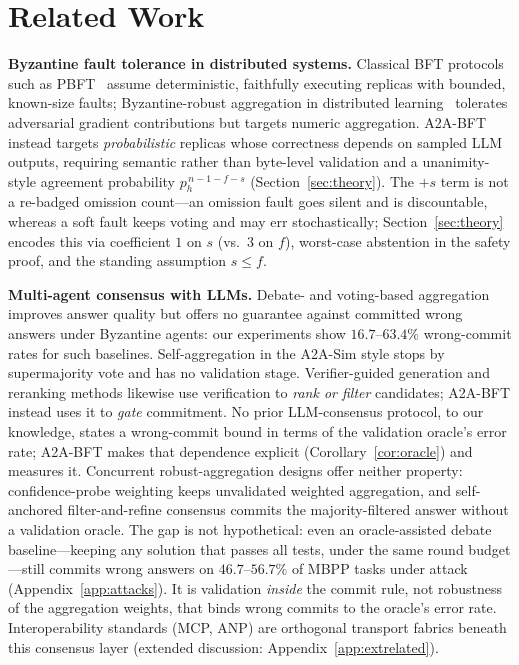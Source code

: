 \documentclass{article}
\begin{document}
\section{Related Work}

\textbf{Byzantine fault tolerance in distributed systems.} Classical BFT protocols such as PBFT~\citep{castro1999practical} assume deterministic, faithfully executing replicas with bounded, known-size faults; Byzantine-robust aggregation in distributed learning~\citep{blanchard2017byzantine} tolerates adversarial gradient contributions but targets numeric aggregation. A2A-BFT instead targets \emph{probabilistic} replicas whose correctness depends on sampled LLM outputs, requiring semantic rather than byte-level validation and a unanimity-style agreement probability $p_h^{\,n-1-f-s}$ (Section~\ref{sec:theory}). The $+s$ term is not a re-badged omission count---an omission fault goes silent and is discountable, whereas a soft fault keeps voting and may err stochastically; Section~\ref{sec:theory} encodes this via coefficient $1$ on $s$ (vs.\ $3$ on $f$), worst-case abstention in the safety proof, and the standing assumption $s \leq f$.

\textbf{Multi-agent consensus with LLMs.} Debate- and voting-based aggregation improves answer quality but offers no guarantee against committed wrong answers under Byzantine agents: our experiments show $16.7$--$63.4\%$ wrong-commit rates for such baselines. Self-aggregation in the A2A-Sim style stops by supermajority vote and has no validation stage. Verifier-guided generation and reranking methods \citep{gsm8k,lightman2024verify} likewise use verification to \emph{rank or filter} candidates; A2A-BFT instead uses it to \emph{gate} commitment. No prior LLM-consensus protocol, to our knowledge, states a wrong-commit bound in terms of the validation oracle's error rate; A2A-BFT makes that dependence explicit (Corollary~\ref{cor:oracle}) and measures it. Concurrent robust-aggregation designs offer neither property: confidence-probe weighting \citep{zheng2025rethinking} keeps unvalidated weighted aggregation, and self-anchored filter-and-refine consensus \citep{lee2026robust} commits the majority-filtered answer without a validation oracle. The gap is not hypothetical: even an oracle-assisted debate baseline---keeping any solution that passes all tests, under the same round budget---still commits wrong answers on $46.7$--$56.7\%$ of MBPP tasks under attack (Appendix~\ref{app:attacks}). It is validation \emph{inside} the commit rule, not robustness of the aggregation weights, that binds wrong commits to the oracle's error rate. Interoperability standards (MCP, ANP) are orthogonal transport fabrics beneath this consensus layer (extended discussion: Appendix~\ref{app:extrelated}).
\end{document}
